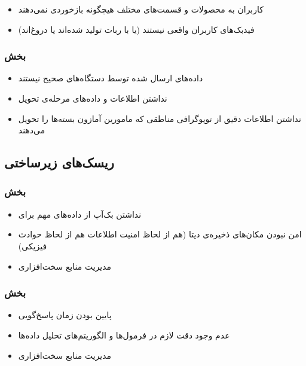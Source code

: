 \begin{itemize}
\item[\risk]
کاربران به محصولات و قسمت‌‌های مختلف هیچگونه بازخوردی نمی‌دهند
\item[\risk]
فید‌بک‌های کاربران واقعی نیستند (یا با ربات تولید شده‌اند یا دروغ‌اند)
\end{itemize}

\subsubsection{بخش }
\begin{itemize}
\item[\risk]
داده‌های ارسال شده توسط دستگاه‌های 
صحیح نیستند
\item[\risk]
نداشتن اطلاعات و داده‌های مرحله‌ی تحویل
\item[\risk] 
نداشتن اطلاعات دقیق از توپوگرافی مناطقی که مامورین آمازون بسته‌ها را تحویل می‌دهند
\end{itemize}

\subsection{ریسک‌های زیرساختی}
\subsubsection{بخش }
\begin{itemize}
\item[\risk]
نداشتن بک‌آپ از داده‌های مهم برای 

\item[\risk]
امن نبودن مکان‌های ذخیره‌ی دیتا (هم از لحاظ‌ امنیت اطلاعات هم از لحاظ حوادث فیزیکی)
\item[\risk]
مدیریت منابع سخت‌افزاری
\end{itemize}

\subsubsection{بخش }
\begin{itemize}
\item[\risk]
پایین بودن زمان پاسخ‌گویی 

\item[\risk]
عدم وجود دقت لازم در فرمول‌ها و الگوریتم‌های تحلیل داده‌ها

\item[\risk]
مدیریت منابع سخت‌افزاری 
\end{itemize}

